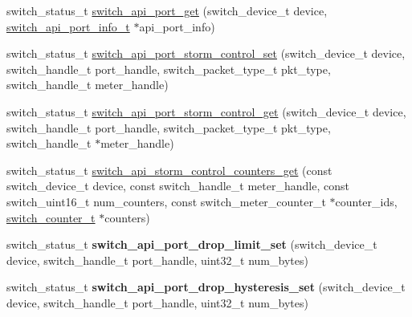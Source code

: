 \begin{DoxyCompactItemize}
\item 
switch\+\_\+status\+\_\+t \hyperlink{group__Port_gab9377eac11e64a53487d5c0f1fabafa4}{switch\+\_\+api\+\_\+port\+\_\+get} (switch\+\_\+device\+\_\+t device, \hyperlink{structswitch__api__port__info__s}{switch\+\_\+api\+\_\+port\+\_\+info\+\_\+t} $\ast$api\+\_\+port\+\_\+info)
\item 
switch\+\_\+status\+\_\+t \hyperlink{group__Port_ga1f9950ab7dfde4c28709c0f8e0d16ba8}{switch\+\_\+api\+\_\+port\+\_\+storm\+\_\+control\+\_\+set} (switch\+\_\+device\+\_\+t device, switch\+\_\+handle\+\_\+t port\+\_\+handle, switch\+\_\+packet\+\_\+type\+\_\+t pkt\+\_\+type, switch\+\_\+handle\+\_\+t meter\+\_\+handle)
\item 
switch\+\_\+status\+\_\+t \hyperlink{group__Port_ga44911c0a2e11f0fc3a229c59e6b39b31}{switch\+\_\+api\+\_\+port\+\_\+storm\+\_\+control\+\_\+get} (switch\+\_\+device\+\_\+t device, switch\+\_\+handle\+\_\+t port\+\_\+handle, switch\+\_\+packet\+\_\+type\+\_\+t pkt\+\_\+type, switch\+\_\+handle\+\_\+t $\ast$meter\+\_\+handle)
\item 
switch\+\_\+status\+\_\+t \hyperlink{group__Port_gaedebd2fb890d2cd97d6a98b2bb48588d}{switch\+\_\+api\+\_\+storm\+\_\+control\+\_\+counters\+\_\+get} (const switch\+\_\+device\+\_\+t device, const switch\+\_\+handle\+\_\+t meter\+\_\+handle, const switch\+\_\+uint16\+\_\+t num\+\_\+counters, const switch\+\_\+meter\+\_\+counter\+\_\+t $\ast$counter\+\_\+ids, \hyperlink{structswitch__counter__s}{switch\+\_\+counter\+\_\+t} $\ast$counters)
\item 
\hypertarget{group__Port_gacc1db4db117fd3876c158bbe7b4df187}{switch\+\_\+status\+\_\+t {\bfseries switch\+\_\+api\+\_\+port\+\_\+drop\+\_\+limit\+\_\+set} (switch\+\_\+device\+\_\+t device, switch\+\_\+handle\+\_\+t port\+\_\+handle, uint32\+\_\+t num\+\_\+bytes)}\label{group__Port_gacc1db4db117fd3876c158bbe7b4df187}

\item 
\hypertarget{group__Port_ga6f864d2070ca27f5757c8e94fdbe16ae}{switch\+\_\+status\+\_\+t {\bfseries switch\+\_\+api\+\_\+port\+\_\+drop\+\_\+hysteresis\+\_\+set} (switch\+\_\+device\+\_\+t device, switch\+\_\+handle\+\_\+t port\+\_\+handle, uint32\+\_\+t num\+\_\+bytes)}\label{group__Port_ga6f864d2070ca27f5757c8e94fdbe16ae}


\end{DoxyCompactItemize}
